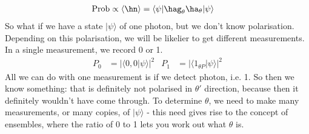 \documentclass[a4paper, 11pt, normalem]{report}
\begin{document}
\begin{figure}[H]
    \centering
    \vspace{-30pt}
\end{figure}
\begin{align}
    \text{Prob} &\propto \langle\hn\rangle = \langle\psi|\hag_\theta\ha_\theta|\psi\rangle
\end{align}
So what if we have a state $|\psi\rangle$ of one photon, but we don't know polarisation. 
Depending on this polarisation, we will be likelier to get different measurements. 
In a single measurement, we record 0 or 1.
\begin{align}
    P_0 &= |\langle0,0|\psi\rangle|^2 & P_1 &= |\langle1_{\theta P}|\psi\rangle|^2
\end{align}
All we can do with one measurement is if we detect photon, i.e. 1. 
So then we know something: that is definitely not polarised in $\theta'$ direction, because then it definitely wouldn't have come through. 
To determine $\theta$, we need to make many measurements, or many copies, of $|\psi\rangle$ - this need gives rise to the concept of ensembles, where the ratio of 0 to 1 lets you work out what $\theta$ is. 
\end{document}
